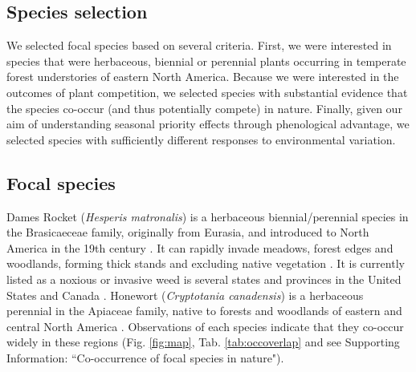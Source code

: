 \documentclass{article}[11pt]
\begin{document}
\subsection*{Species selection}
We selected focal species based on several criteria. First, we were interested in species that were herbaceous, biennial or perennial plants occurring in temperate forest understories of eastern North America. Because we were interested in the outcomes of plant competition, we selected species with substantial evidence that the species co-occur (and thus potentially compete) in nature. Finally, given our aim of understanding seasonal priority effects through phenological advantage, we selected species with sufficiently different responses to environmental variation.

\subsection*{Focal species}
Dames Rocket (\textit{Hesperis matronalis}) is a herbaceous biennial/perennial species in the Brasicaeceae family, originally from Eurasia, and introduced to North America in the 19th century \citep{Francis:2009wz}. It  can rapidly invade  meadows, forest edges and woodlands, forming thick stands and excluding native vegetation \citep{Francis:2009wz}. It is currently listed as a noxious or invasive weed is several states and provinces in the United States and Canada \citep{Susko:2008ut}. Honewort (\textit{Cryptotania canadensis}) is a herbaceous perennial in the Apiaceae family, native to forests and woodlands of eastern and central North America \citep{Hawkins:2007vb}. Observations of each species indicate that they co-occur widely in these regions (Fig. \ref{fig:map}, Tab. \ref{tab:occoverlap} and see Supporting Information: ``Co-occurrence of focal species in nature").  
\end{document}
